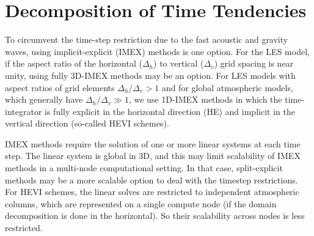 \documentclass{report}
\begin{document}
\section{Decomposition of Time Tendencies}

To circumvent the time-step restriction due to the fast acoustic and gravity waves, using implicit-explicit (IMEX) methods is one option. For the LES model, if the aspect ratio of the horizontal ($\Delta_h$) to vertical ($\Delta_v$) grid spacing is near unity, using fully 3D-IMEX methods may be an option.  For LES models with aspect ratios of grid elements $\Delta_h/\Delta_v > 1$ and for global atmospheric models, which generally have $\Delta_h/\Delta_v \gg 1$, we use 1D-IMEX methods in which the time-integrator is fully explicit in the horizontal direction (HE) and implicit in the vertical direction (so-called HEVI schemes). 

IMEX methods require the solution of one or more linear systems at each time step. The linear system is global in 3D, and this may limit scalability of IMEX methods in a multi-node computational setting. In that case, split-explicit methods may be a more scalable option to deal with the timestep restrictions. For HEVI schemes, the linear solves are restricted to independent atmospheric columns, which are represented on a single compute node (if the domain decomposition is done in the horizontal). So their scalability across nodes is less restricted.
\end{document}
